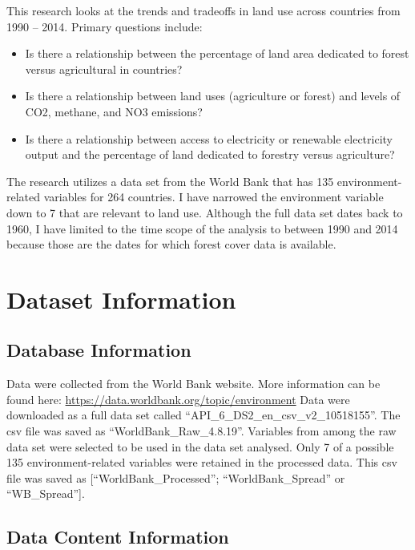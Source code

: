 \documentclass[12pt,]{article}
\providecommand{\tightlist}{%
  \setlength{\itemsep}{0pt}\setlength{\parskip}{0pt}}
\begin{document}
This research looks at the trends and tradeoffs in land use across
countries from 1990 -- 2014. Primary questions include:

\begin{itemize}
\tightlist
\item
  Is there a relationship between the percentage of land area dedicated
  to forest versus agricultural in countries?
\item
  Is there a relationship between land uses (agriculture or forest) and
  levels of CO2, methane, and NO3 emissions?
\item
  Is there a relationship between access to electricity or renewable
  electricity output and the percentage of land dedicated to forestry
  versus agriculture?
\end{itemize}

The research utilizes a data set from the World Bank that has 135
environment-related variables for 264 countries. I have narrowed the
environment variable down to 7 that are relevant to land use. Although
the full data set dates back to 1960, I have limited to the time scope
of the analysis to between 1990 and 2014 because those are the dates for
which forest cover data is available.

\newpage

\section{Dataset Information}\label{dataset-information}

\subsection{Database Information}\label{database-information}

Data were collected from the World Bank website. More information can be
found here: \url{https://data.worldbank.org/topic/environment} Data were
downloaded as a full data set called
``API\_6\_DS2\_en\_csv\_v2\_10518155''. The csv file was saved as
``WorldBank\_Raw\_4.8.19''. Variables from among the raw data set were
selected to be used in the data set analysed. Only 7 of a possible 135
environment-related variables were retained in the processed data. This
csv file was saved as {[}``WorldBank\_Processed''; ``WorldBank\_Spread''
or ``WB\_Spread''{]}.

\subsection{Data Content Information}\label{data-content-information}
\end{document}
